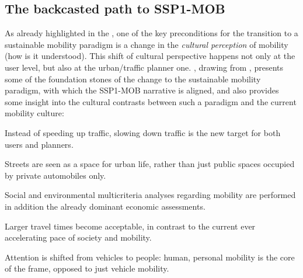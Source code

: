 \subsection{The backcasted path to SSP1-MOB}
\label{ss:results:backcasting-the-path}
As already highlighted in the , one of the key preconditions for the transition to a sustainable mobility paradigm is a change in the \emph{cultural perception} of mobility (how is it understood). This shift of cultural perspective happens not only at the user level, but also at the urban/traffic planner one. \textcite{banister2008_sustainablemobilityparadigm}, drawing from \textcite{marshall2001_challengesustainabletransport}, presents some of the foundation stones of the change to the sustainable mobility paradigm, with which the SSP1-MOB narrative is aligned, and also provides some insight into the cultural contrasts between such a paradigm and the current mobility culture:
%
\begin{enumeratealpha}
\item Instead of speeding up traffic, slowing down traffic is the new target for both users and planners.
\item Streets are seen as a space for urban life, rather than just public spaces occupied by private automobiles only.
\item Social and environmental multicriteria analyses regarding mobility are performed in addition the already dominant economic assessments.
\item Larger travel times become acceptable, in contrast to the current ever accelerating pace of society and mobility.
\item Attention is shifted from vehicles to people: human, personal mobility is the core of the frame, opposed to just vehicle mobility.
\end{enumeratealpha}

